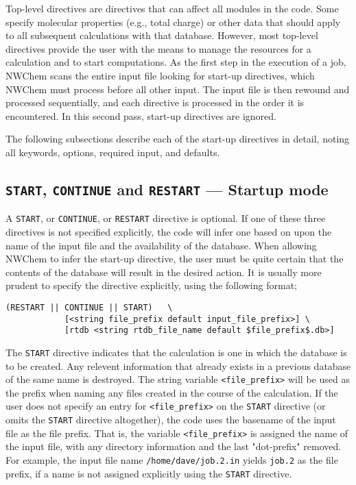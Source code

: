\label{sec:toplevel}

Top-level directives are directives that can affect all
modules in the code.  Some specify molecular properties (e.g., total
charge) or other data that should apply to all subsequent
calculations with that database.  However, most top-level directives 
provide the user
with the means to manage the resources for a calculation and to start
computations.  As the first step in the execution of a job, NWChem
scans the entire input file looking for start-up directives, which
NWChem must process before all other input.  The input file is then
rewound and processed sequentially, and each directive is processed in
the order it is encountered.  In this second pass, start-up directives
are ignored.

The following subsections describe each of the start-up directives in detail,
noting all keywords, options, required input, and defaults.

\subsection{{\tt START}, {\tt CONTINUE} and {\tt RESTART} --- Startup mode}
\label{sec:start}

A {\tt START}, or {\tt CONTINUE}, or {\tt RESTART} directive is
optional.  If one of these three directives is not specified
explicitly, the code will infer one based on upon the name of the
input file and the availability of the database.  When allowing NWChem
to infer the start-up directive, the user must be quite certain that
the contents of the database will result in the desired action.  It
is usually more prudent to specify the directive explicitly, using the
following format;

\begin{verbatim}
(RESTART || CONTINUE || START)   \
            [<string file_prefix default input_file_prefix>] \
            [rtdb <string rtdb_file_name default $file_prefix$.db>]
\end{verbatim}

The \verb+START+ directive indicates that the calculation is one in
which the database is to be created.  Any relevent information that
already exists in a previous database of the same name is destroyed.
The string variable {\tt <file\_prefix>} will be used as the prefix
when naming any files created in the course of the calculation.  If
the user does not specify an entry for {\tt <file\_prefix>} on the
\verb+START+ directive (or omits the \verb+START+ directive
altogether), the code uses the basename of the input file as the file
prefix.  That is, the variable {\tt <file\_prefix>} is assigned
the name of the input file, with any directory
information and the last "dot-prefix" removed.  For example,
the input file
name \verb+/home/dave/job.2.in+ yields \verb+job.2+ as the file
prefix, if a name is not assigned explicitly using the \verb+START+
directive.

